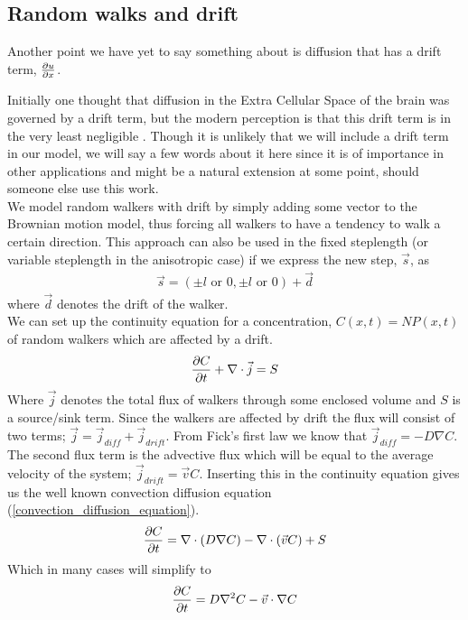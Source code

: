 \subsection{Random walks and drift}\label{random_walks_and_drift}

Another point we have yet to say something about is diffusion that has a drift term, $\frac{\partial u}{\partial x}$. 

Initially one thought that diffusion in the Extra Cellular Space of the brain was governed by a drift term, but the modern perception is that this drift term is in the very least negligible \cite{nicholson2001diffusion}. 
Though it is unlikely that we will include a drift term in our model, we will say a few words about it here since it is of importance in other applications and might be a natural extension at some point, should someone else use this work.\\
We model random walkers with drift by simply adding some vector to the Brownian motion model, thus forcing all walkers to have a tendency to walk a certain direction. 
This approach can also be used in the fixed steplength (or variable steplength in the anisotropic case)  if we express the new step, $\vec{s}$, as
\begin{align*}
 \vec{s} = (\pm l \text{ or }0,\pm l \text{ or }0) +\vec{d}
\end{align*}
where $\vec{d}$ denotes the drift of the walker.\\
We can set up the continuity equation for a concentration, $C(x,t) = NP(x,t)$ of random walkers which are affected by a drift.
\begin{equation}
 \frac{\partial C}{\partial t} +\nabla\cdot\vec{j} = S
\end{equation}
Where $\vec{j}$ denotes the total flux of walkers through some enclosed volume and $S$ is a source/sink term. 
Since the walkers are affected by drift the flux will consist of two terms; $\vec{j} = \vec{j}_{diff}+\vec{j}_{drift}$. 
From Fick's first law we know that $\vec{j}_{diff} = -D\nabla C$. 
The second flux term is the advective flux which will be equal to the average velocity of the system; $\vec{j}_{drift} = \vec{v}C$. 
Inserting this in the continuity equation gives us the well known convection diffusion equation (\ref{convection_diffusion_equation}).
\begin{equation}\label{convection_diffusion_equation}
 \frac{\partial C}{\partial t} = \nabla\cdot\left(D\nabla C\right)-\nabla\cdot\left(\vec{v}C\right) + S
\end{equation}
Which in many cases will simplify to
\begin{equation}
 \frac{\partial C}{\partial t} = D\nabla^2 C-\vec{v}\cdot\nabla C
\end{equation}

